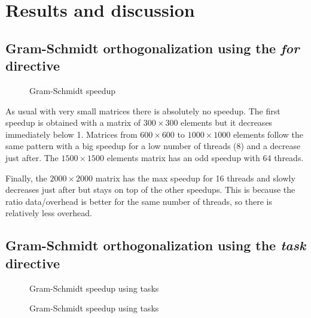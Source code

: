 \chapter{Results and discussion}

\section{Gram-Schmidt orthogonalization using the \textit{for} directive}

\begin{figure}[ht]
  \begin{center}
  \end{center}
  \caption{Gram-Schmidt speedup}
  \label{fig:gram_speedup}
\end{figure} 

As usual with very small matrices there is absolutely no speedup. The first speedup is obtained with a matrix of $300\times 300$ elements but it decreases immediately below 1. Matrices from $600\times 600$ to $1000\times 1000$ elements follow the same pattern with a big speedup for a low number of threads (8) and a decrease just after. The $1500\times 1500$ elements matrix has an odd speedup with 64 threads.

Finally, the $2000\times 2000$ matrix has the max speedup for 16 threads and slowly decreases just after but stays on top of the other speedups. This is because the ratio data/overhead is better for the same number of threads, so there is relatively less overhead.

\section{Gram-Schmidt orthogonalization using the \textit{task} directive}

\begin{figure}[ht]
  \begin{center}
  \end{center}
  \caption{Gram-Schmidt speedup using tasks}
  \label{fig:gram_speedup_task}
\end{figure} 

\begin{figure}[ht]
  \begin{center}
  \end{center}
  \caption{Gram-Schmidt speedup using tasks}
  \label{fig:gram_speedup_task_2}
\end{figure} 


